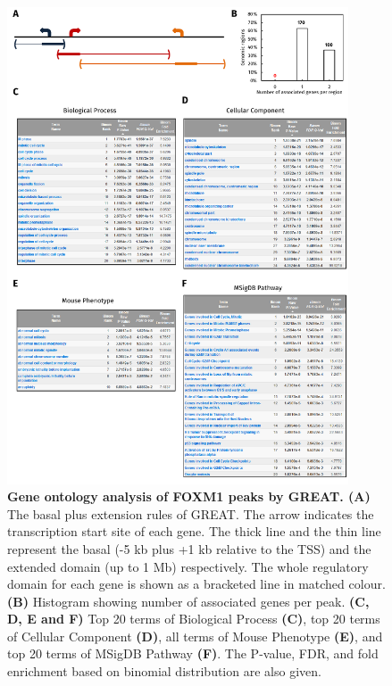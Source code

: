 \begin{figure}[!h]
    \centering
    \includegraphics[width=0.9\textwidth]{chapter3/figures_foxm1/fig18.pdf}
    \caption[Gene ontology analysis of FOXM1 peaks by GREAT]{\textbf{Gene ontology analysis of FOXM1 peaks by GREAT. (A)} The basal plus extension rules of GREAT. The arrow indicates the transcription start site of each gene. The thick line and the thin line represent the basal (-5 kb plus +1 kb relative to the TSS) and the extended domain (up to 1 Mb) respectively. The whole regulatory domain for each gene is shown as a bracketed line in matched colour. \textbf{(B)} Histogram showing number of associated genes per peak. \textbf{(C, D, E and F)} Top 20 terms of Biological Process \textbf{(C)}, top 20 terms of Cellular Component \textbf{(D)}, all terms of Mouse Phenotype \textbf{(E)}, and top 20 terms of MSigDB Pathway \textbf{(F)}. The P-value, FDR, and fold enrichment based on binomial distribution are also given.}
    \label{fig:fig18}
\end{figure}

